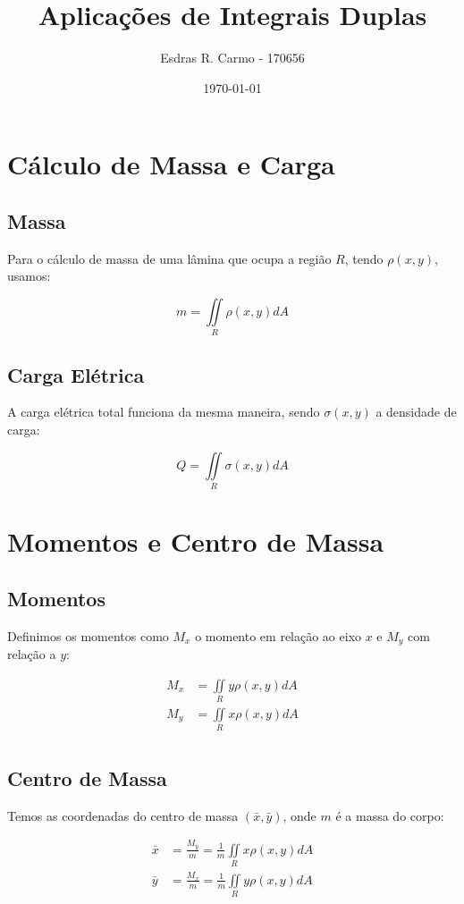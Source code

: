 \documentclass{article}
\author{Esdras R. Carmo - 170656}
\title{Aplicações de Integrais Duplas}
\date{\today}
\newcommand{\doubleint}[1] {\iint\limits_R #1 dA}
\begin{document}
    \maketitle

    \section{Cálculo de Massa e Carga}
        \subsection{Massa}
            Para o cálculo de massa de uma lâmina que ocupa a região $R$, tendo $\rho(x,y)$, usamos:

            \[
                m = \doubleint{\rho(x,y)}
            \]

        \subsection{Carga Elétrica}
            A carga elétrica total funciona da mesma maneira, sendo $\sigma(x,y)$ a densidade de carga:

            \[
                Q = \doubleint{\sigma(x,y)}
            \]

    \section{Momentos e Centro de Massa}
        \subsection{Momentos}
            Definimos os momentos como $M_x$ o momento em relação ao eixo $x$ e $M_y$ com relação a $y$:

            \begin{align*}
                M_x &= \doubleint{y \rho(x,y)}\\
                M_y &= \doubleint{x \rho(x,y)}\\
            \end{align*}
        
        \subsection{Centro de Massa}
            Temos as coordenadas do centro de massa $(\bar{x}, \bar{y})$, onde $m$ é a massa do corpo:

            \begin{align*}
                \bar{x} &= \frac{M_y}{m} = \frac{1}{m} \doubleint{x \rho(x,y)}\\
                \bar{y} &= \frac{M_x}{m} = \frac{1}{m} \doubleint{y \rho(x,y)}\\
            \end{align*}
\end{document}
